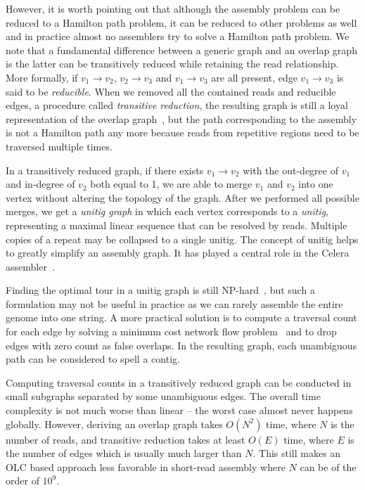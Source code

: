\documentclass{bioinfo}
\begin{document}
\begin{methods}
However, it is worth pointing out that although the assembly problem can be reduced to a
Hamilton path problem, it can be reduced to other problems as well and in
practice almost no assemblers try to solve a Hamilton path problem.  We note that a
fundamental difference between a generic graph and an overlap graph is the
latter can be transitively reduced while retaining the read
relationship. More formally, if $v_1\to v_2$, $v_2\to v_3$ and $v_1\to v_3$ are
all present, edge $v_1\to v_3$ is said to be \emph{reducible}. When we removed
all the contained reads and reducible edges, a procedure called
\emph{transitive reduction}, the resulting graph is still a loyal
representation of the overlap graph~\citep{Myers:1995nx}, but the path
corresponding to the assembly is not a Hamilton path any more because reads
from repetitive regions need to be traversed multiple times.

In a transitively reduced graph, if there exists $v_1\to v_2$ with the
out-degree of $v_1$ and in-degree of $v_2$ both equal to 1, we are able to
merge $v_1$ and $v_2$ into one vertex without altering the topology of the
graph. After we performed all possible merges, we get a \emph{unitig graph} in
which each vertex corresponds to a \emph{unitig}, representing a maximal linear
sequence that can be resolved by reads. Multiple copies of a repeat may be
collapsed to a single unitig. The concept of unitig helps to greatly simplify
an assembly graph. It has played a central role in the Celera
assembler~\citep{Myers:2000kl}.

Finding the optimal tour in a unitig graph is still
NP-hard~\citep{DBLP:conf/wabi/MedvedevGMB07}, but such a formulation may
not be useful in practice as we can rarely assemble the entire genome into
one string. A more practical solution is to compute a traversal count
for each edge by solving a minimum cost network flow
problem~\citep{Myers:2005bh} and to drop edges with zero count as false
overlaps. In the resulting graph, each unambiguous path can be considered to
spell a contig.

Computing traversal counts in a transitively reduced graph can be conducted
in small subgraphs separated by some unambiguous edges. The overall time
complexity is not much worse than linear -- the worst case almost never happens
globally.  However, deriving an overlap graph takes $O(N^2)$ time, where $N$ is
the number of reads, and transitive reduction takes at least $O(E)$ time, where
$E$ is the number of edges which is usually much larger than $N$. This still
makes an OLC based approach less favorable in short-read assembly where $N$ can
be of the order of $10^9$.


\end{methods}
\end{document}
